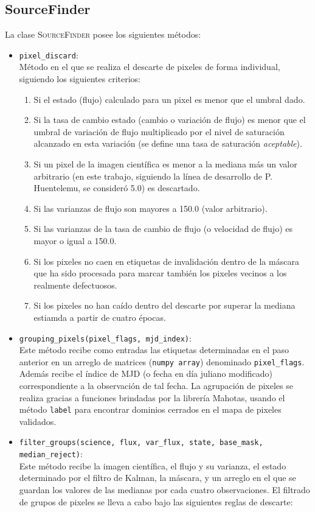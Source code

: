 \subsection{SourceFinder}
La clase \textsc{SourceFinder} posee los siguientes m\'etodos:
\begin{itemize}
\item \texttt{pixel\_discard}:\\
M\'etodo en el que se realiza el descarte de pixeles de forma individual, siguiendo los siguientes criterios:
\begin{enumerate}
\item Si el estado (flujo) calculado para un pixel es menor que el umbral dado.
\item Si la tasa de cambio estado (cambio o variaci\'on de flujo) es menor que el umbral de variaci\'on de flujo multiplicado por el nivel de saturaci\'on alcanzado en esta variaci\'on (se define una tasa de saturaci\'on \textit{aceptable}).
\item Si un pixel de la imagen cient\'ifica es menor a la mediana m\'as un valor arbitrario (en este trabajo, siguiendo la l\'inea de desarrollo de P. Huentelemu, se consider\'o 5.0) es descartado.
\item Si las varianzas de flujo son mayores a 150.0 (valor arbitrario).
\item Si las varianzas de la tasa de cambio de flujo (o velocidad de flujo) es mayor o igual a 150.0.
\item Si los pixeles no caen en etiquetas de invalidaci\'on dentro de la m\'ascara que ha sido procesada para marcar tambi\'en los pixeles vecinos a los realmente defectuosos.
\item Si los pixeles no han ca\'ido dentro del descarte por superar la mediana estiamda a partir de cuatro \'epocas. 
\end{enumerate}
\item \texttt{grouping\_pixels(pixel\_flags, mjd\_index)}:\\
Este m\'etodo recibe como entradas las etiquetas determinadas en el paso anterior en un arreglo de matrices (\texttt{numpy array}) denominado \texttt{pixel\_flags}. Adem\'as recibe el \'indice de MJD (o fecha en d\'ia juliano modificado) correspondiente a la observaci\'on de tal fecha.
La agrupaci\'on de pixeles se realiza gracias a funciones brindadas por la librer\'ia \textsf{Mahotas}, usando el m\'etodo \texttt{label} para encontrar dominios cerrados en el mapa de pixeles validados.
\bigskip

\item \texttt{filter\_groups(science, flux, var\_flux, state, base\_mask, median\_reject)}:\\
Este m\'etodo recibe la imagen cient\'ifica, el flujo y su varianza, el estado determinado por el filtro de Kalman, la m\'ascara, y un arreglo en el que se guardan los valores de las medianas por cada cuatro observaciones. 
El filtrado de grupos de pixeles se lleva a cabo bajo las siguientes reglas de descarte: 


\end{itemize}
